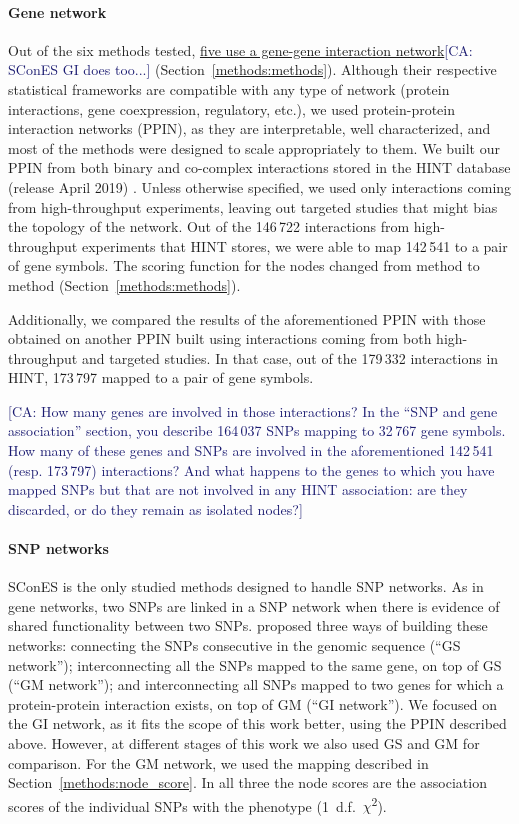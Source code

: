\documentclass[twocolumn, 11pt]{article}
\newcommand{\cazcom}[2]{{\uline{#1}}\unskip\space\textcolor{MidnightBlue}{[CA: #2]}}
\begin{document}
\paragraph{Gene network}
Out of the six methods tested, \cazcom{five use a gene-gene interaction network}{SConES GI does too...} (Section~\ref{methods:methods}). Although their respective statistical frameworks are compatible with any type of network (protein interactions, gene coexpression, regulatory, etc.), we used protein-protein interaction networks (PPIN), as they are interpretable, well characterized, and most of the methods were designed to scale appropriately to them. We built our PPIN from both binary and co-complex interactions stored in the HINT database (release April 2019) \cite{das_hint:_2012}. Unless otherwise specified, we used only interactions coming from high-throughput experiments, leaving out targeted studies that might bias the topology of the network. Out of the 146\,722 interactions from high-throughput experiments that HINT stores, we were able to map 142\,541 to a pair of gene symbols. The scoring function for the nodes changed from method to method (Section~\ref{methods:methods}).

Additionally, we compared the results of the aforementioned PPIN with those obtained on another PPIN built using interactions coming from both high-throughput and targeted studies. In that case, out of the 179\,332 interactions in HINT, 173\,797 mapped to a pair of gene symbols. 

\cazcom{}{How many genes are involved in those interactions? In the ``SNP and gene association'' section, you describe 164\,037 SNPs mapping to 32\,767 gene symbols. How many of these genes and SNPs are involved in the aforementioned 142\,541 (resp. 173\,797) interactions? And what happens to the genes to which you have mapped SNPs but that are not involved in any HINT association: are they discarded, or do they remain as isolated nodes?} 

\paragraph{SNP networks}
SConES \cite{azencott_efficient_2013} is the only studied methods designed to handle SNP networks. As in gene networks, two SNPs are linked in a SNP network when there is evidence of shared functionality between two SNPs. \citet{azencott_efficient_2013} proposed three ways of building these networks: connecting the SNPs consecutive in the genomic sequence (``GS network''); interconnecting all the SNPs mapped to the same gene, on top of GS (``GM network''); and interconnecting all SNPs mapped to two genes for which a protein-protein interaction exists, on top of GM (``GI network''). We focused on the GI network, as it fits the scope of this work better, using the PPIN described above. However, at different stages of this work we also used GS and GM for comparison. For the GM network, we used the mapping described in Section~\ref{methods:node_score}. In all three the node scores are the association scores of the individual SNPs with the phenotype (1~d.f.~\(\chi\)\textsuperscript{2}).
\end{document}
